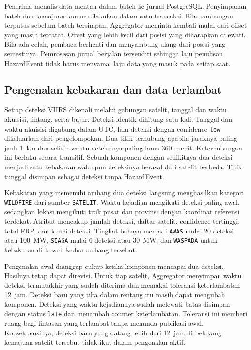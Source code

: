 Penerima menulis data mentah dalam batch ke jurnal PostgreSQL. Penyimpanan batch dan kemajuan kursor dilakukan dalam satu transaksi. Bila sambungan terputus sebelum batch tersimpan, Aggregator meminta kembali mulai dari offset yang masih tercatat. Offset yang lebih kecil dari posisi yang diharapkan dilewati. Bila ada celah, pembaca berhenti dan menyambung ulang dari posisi yang semestinya. Pemrosesan jurnal berjalan tersendiri sehingga laju penulisan HazardEvent tidak harus menyamai laju data yang masuk pada setiap saat.

\subsection{Pengenalan kebakaran dan data terlambat}

Setiap deteksi VIIRS dikenali melalui gabungan satelit, tanggal dan waktu akuisisi, lintang, serta bujur. Deteksi identik dihitung satu kali. Tanggal dan waktu akuisisi digabung dalam UTC, lalu deteksi dengan confidence \texttt{low} dikeluarkan dari pengelompokan. Dua titik terhubung apabila jaraknya paling jauh 1~km dan selisih waktu deteksinya paling lama 360~menit. Keterhubungan ini berlaku secara transitif. Sebuah komponen dengan sedikitnya dua deteksi menjadi satu kebakaran walaupun deteksinya berasal dari satelit berbeda. Titik tunggal disimpan sebagai deteksi tanpa HazardEvent.

Kebakaran yang memenuhi ambang dua deteksi langsung menghasilkan  kategori \texttt{WILDFIRE} dari sumber \texttt{SATELIT}. Waktu kejadian mengikuti deteksi paling awal, sedangkan lokasi mengikuti titik pusat dan provinsi dengan koordinat referensi terdekat. Atribut mencakup jumlah deteksi, daftar satelit, confidence tertinggi, total FRP, dan kunci deteksi. Tingkat bahaya menjadi \texttt{AWAS} mulai 20 deteksi atau 100~MW, \texttt{SIAGA} mulai 6 deteksi atau 30~MW, dan \texttt{WASPADA} untuk kebakaran di bawah kedua ambang tersebut.

Pengenalan awal dianggap cukup ketika komponen mencapai dua deteksi. Hasilnya tetap dapat direvisi. Untuk tiap satelit, Aggregator menyimpan waktu deteksi termutakhir yang sudah diterima dan memakai toleransi keterlambatan 12~jam. Deteksi baru yang tiba dalam rentang itu masih dapat mengubah komponen. Deteksi yang waktu kejadiannya sudah melewati batas disimpan dengan status \texttt{late} dan menambah counter keterlambatan. Toleransi ini memberi ruang bagi lintasan yang terlambat tanpa menunda publikasi awal. Konsekuensinya, deteksi baru yang datang lebih dari 12~jam di belakang kemajuan satelit tersebut tidak ikut dalam pengenalan aktif.

